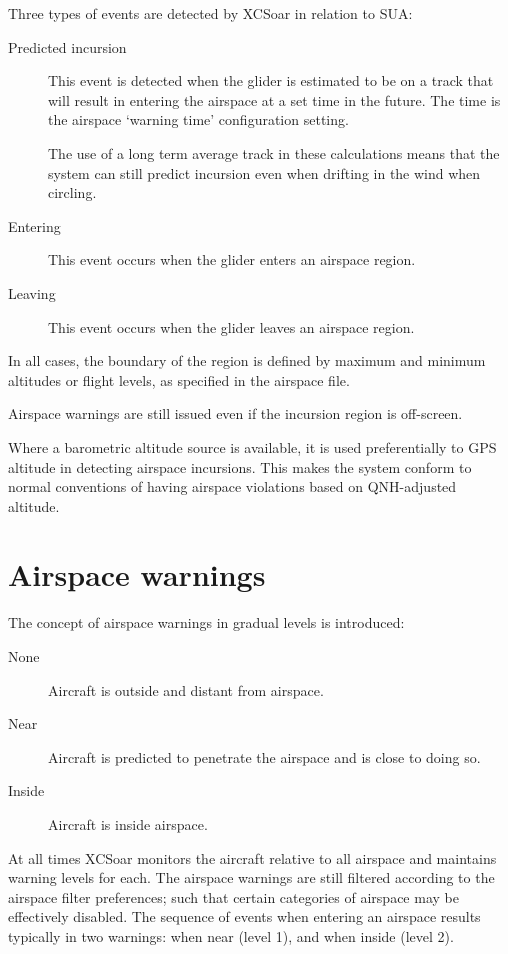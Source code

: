 Three types of events are detected by XCSoar in relation to SUA:
\begin{description}
\item[Predicted incursion] This event is detected when the glider is estimated
to be on a track that will result in entering the airspace at a set
time in the future.  The time is the airspace `warning time'
configuration setting.

The use of a long term average track in these calculations means that
the system can still predict incursion even when drifting in the wind
when circling.


\item[Entering] This event occurs when the glider enters an airspace region.
\item[Leaving] This event occurs when the glider leaves an airspace region.
\end{description}
In all cases, the boundary of the region is defined by maximum and
minimum altitudes or flight levels, as specified in the airspace file.

Airspace warnings are still issued even if the incursion region is
off-screen.

Where a barometric altitude source is available, it is used
preferentially to GPS altitude in detecting airspace incursions.  This
makes the system conform to normal conventions of having airspace
violations based on QNH-adjusted altitude.


\section{Airspace warnings}

The concept of airspace warnings in gradual levels is introduced:
\begin{description}
\item[None] Aircraft is outside and distant from airspace.
\item[\colorbox{AirspaceYellow}{Near}] Aircraft is predicted to penetrate the airspace and 
  is close to doing so.
\item[\colorbox{AirspaceRed}{Inside}] Aircraft is inside airspace.
\end{description}

At all times XCSoar monitors the aircraft relative to all airspace and
maintains warning levels for each.  The airspace warnings are still
filtered according to the airspace filter preferences; such that
certain categories of airspace may be effectively disabled.
The sequence of events when entering an airspace results typically
in two warnings: when near (level 1), and when inside (level 2).

